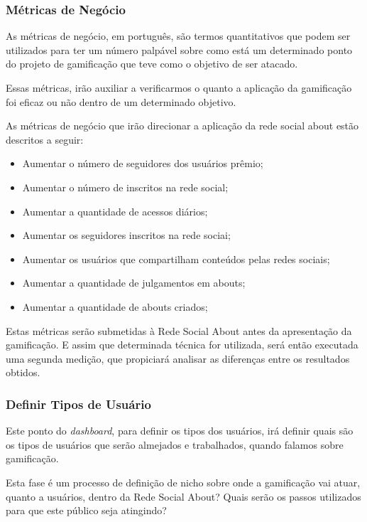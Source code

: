 \subsubsection{Métricas de Negócio}
\label{sub:business_metrics}
As métricas de negócio, em português, são termos quantitativos que podem ser utilizados
para ter um número palpável sobre como está um determinado ponto do projeto de gamificação
que teve como o objetivo de ser atacado.

Essas métricas, irão auxiliar a verificarmos o quanto a aplicação da gamificação foi 
eficaz ou não dentro de um determinado objetivo.

As métricas de negócio que irão direcionar a aplicação da rede social about estão
descritos a seguir:

\begin{itemize}
    \item Aumentar o número de seguidores dos usuários prêmio;
    \item Aumentar o número de inscritos na rede social;
    \item Aumentar a quantidade de acessos diários;
    \item Aumentar os seguidores inscritos na rede sociai;
    \item Aumentar os usuários que compartilham conteúdos pelas redes sociais;
    \item Aumentar a quantidade de julgamentos em abouts;
    \item Aumentar a quantidade de abouts criados;
\end{itemize}

Estas métricas serão submetidas à Rede Social About antes da apresentação da
gamificação. E assim que determinada técnica for utilizada, será então executada uma
segunda medição, que propiciará analisar as diferenças entre os resultados obtidos.

\subsubsection{Definir Tipos de Usuário}
\label{sub:define_user_types}
Este ponto do \textit{dashboard}, para definir os tipos dos usuários, irá
definir quais são os tipos de usuários que serão almejados e trabalhados, quando
falamos sobre gamificação.

Esta fase é um processo de definição de nicho sobre onde a gamificação vai atuar, quanto a
usuários, dentro da Rede Social About? Quais serão os passos utilizados para que este público
seja atingindo?

